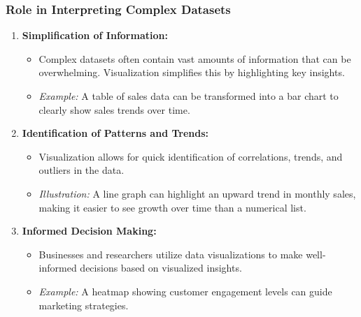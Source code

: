 \documentclass[aspectratio=169]{beamer}
\begin{document}
\begin{frame}[fragile]
    \frametitle{Role in Interpreting Complex Datasets}
    \begin{enumerate}
        \item \textbf{Simplification of Information:}
        \begin{itemize}
            \item Complex datasets often contain vast amounts of information that can be overwhelming. Visualization simplifies this by highlighting key insights.
            \item \textit{Example:} A table of sales data can be transformed into a bar chart to clearly show sales trends over time.
        \end{itemize}
        
        \item \textbf{Identification of Patterns and Trends:}
        \begin{itemize}
            \item Visualization allows for quick identification of correlations, trends, and outliers in the data.
            \item \textit{Illustration:} A line graph can highlight an upward trend in monthly sales, making it easier to see growth over time than a numerical list.
        \end{itemize}

        \item \textbf{Informed Decision Making:}
        \begin{itemize}
            \item Businesses and researchers utilize data visualizations to make well-informed decisions based on visualized insights.
            \item \textit{Example:} A heatmap showing customer engagement levels can guide marketing strategies.
        \end{itemize}
    \end{enumerate}
\end{frame}
\end{document}
